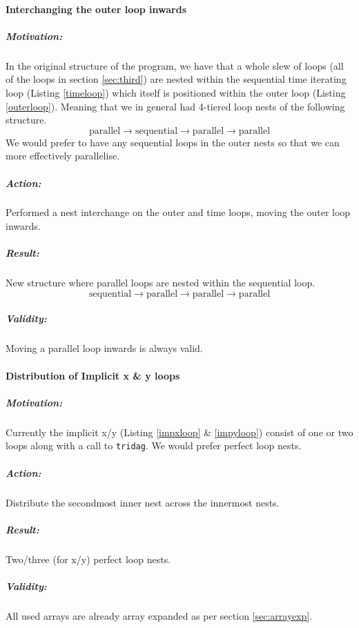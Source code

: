 \paragraph{Interchanging the outer loop inwards}
\subparagraph{Motivation:} In the original structure of the program, we have that a whole slew of loops
 (all of the loops in section \ref{sec:third}) are nested
 within the sequential time iterating loop (Listing \ref{timeloop}) which itself is positioned within
 the outer loop (Listing \ref{outerloop}). Meaning that we in general had 4-tiered loop nests of the following
 structure.
$$\mathrm{parallel} \to \mathrm{sequential} \to \mathrm{parallel} \to \mathrm{parallel}$$
We would prefer to have any sequential loops in the outer nests so that we can more effectively
 parallelise.
\subparagraph{Action:} Performed a nest interchange on the outer and time loops, moving the outer loop inwards.
\subparagraph{Result:} New structure where parallel loops are nested within the sequential loop.
$$\mathrm{sequential} \to \mathrm{parallel} \to \mathrm{parallel} \to \mathrm{parallel}$$
\subparagraph{Validity:} Moving a parallel loop inwards is always valid.

\paragraph{Distribution of Implicit x \& y loops}
\subparagraph{Motivation:} Currently the implicit x/y (Listing \ref{impxloop} \& \ref{impyloop}) consist of one or two loops along with a call
 to \verb!tridag!. We would prefer perfect loop nests.
\subparagraph{Action:} Distribute the secondmost inner nest across the innermost nests.
\subparagraph{Result:} Two/three (for x/y) perfect loop nests.
\subparagraph{Validity:} All used arrays are already array expanded as per section \ref{sec:arrayexp}.
